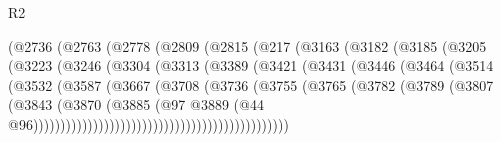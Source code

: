 \begin{lexlean}{R2}
\begin{coremodule}
                            (@2736
                              (@2763
                                (@2778
                                  (@2809
                                    (@2815
                                      (@217
                                        (@3163
                                          (@3182
                                            (@3185
                                              (@3205
                                                (@3223
                                                  (@3246
                                                    (@3304
                                                      (@3313
                                                        (@3389
                                                          (@3421
                                                            (@3431
                                                              (@3446
                                                                (@3464
                                                                  (@3514
                                                                    (@3532
                                                                      (@3587
                                                                        (@3667
                                                                          (@3708
                                                                            (@3736
                                                                              (@3755
                                                                                (@3765
                                                                                  (@3782
                                                                                    (@3789
                                                                                      (@3807
                                                                                        (@3843
                                                                                          (@3870
                                                                                            (@3885
                                                                                              (@97
                                                                                                @3889
                                                                                                (@44
                                                                                                  @96)))))))))))))))))))))))))))))))))))))))))))))))

\end{coremodule}
\end{lexlean}
